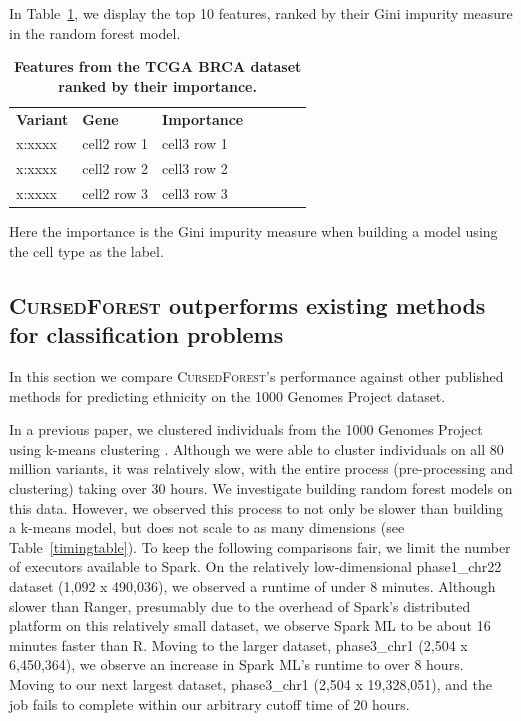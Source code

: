 \documentclass[10pt,letterpaper]{article}
\newlength\savedwidth
\newcommand\thickhline{\noalign{\global\savedwidth\arrayrulewidth\global\arrayrulewidth 2pt}%
\hline
\noalign{\global\arrayrulewidth\savedwidth}}
\newcommand{\cursedforest}{\textsc{CursedForest}\xspace}
\let\oldmarginpar\marginpar
\renewcommand\marginpar[1]{\-\oldmarginpar[\raggedleft\footnotesize #1]%
{\raggedright\footnotesize #1}}
\begin{document}
In Table~\ref{featuretable}, we display the top 10 features, ranked by their Gini impurity measure in the random forest model.

\begin{table}[!ht]
\centering
\caption{
{\bf Features from the TCGA BRCA dataset ranked by their importance.}}
\begin{tabular}{|l|l|l|l|l|l|l|}
\hline
{\bf Variant} & {\bf Gene} & {\bf Importance}\\ \thickhline
x:xxxx & cell2 row 1 & cell3 row 1\\ \hline
x:xxxx & cell2 row 2 & cell3 row 2\\ \hline
x:xxxx & cell2 row 3 & cell3 row 3\\ \hline
\end{tabular}
\begin{flushleft} 
Here the importance is the Gini impurity measure when building a model using the cell type as the label.
\end{flushleft}
\label{featuretable}
\end{table}






\subsection{\cursedforest outperforms existing methods for classification problems}
In this section we compare \cursedforest's performance against other published methods for predicting ethnicity on the
1000 Genomes Project dataset.

In a previous paper, we clustered individuals from the 1000 Genomes Project using k-means clustering \cite{Obrien2016}.
\marginpar{reference is missing}
Although we were able to cluster individuals on all 80 million variants, it was relatively slow, with the entire
process (pre-processing and clustering) taking over 30 hours.
We investigate building random forest models on this data. However, we observed this process to not only be slower
than building a k-means model, but does not scale to as many dimensions (see Table~\ref{timingtable}). To keep
the following comparisons fair, we limit the number of executors available to Spark. On the relatively low-dimensional
phase1\_chr22 dataset (1,092 x 490,036), we observed a runtime of under 8 minutes. Although slower than Ranger, 
presumably due to the overhead of Spark's distributed platform on this relatively small dataset, we observe Spark ML to
be about 16 minutes faster than R. Moving to the larger dataset, phase3\_chr1 (2,504 x 6,450,364), we observe an increase
in Spark ML's runtime to over 8 hours. Moving to our next largest dataset, phase3\_chr1 (2,504 x 19,328,051), and the
job fails to complete within our arbitrary cutoff time of 20 hours.
\end{document}
